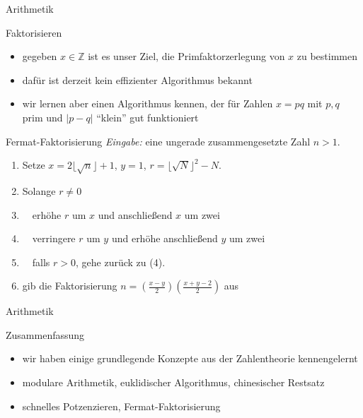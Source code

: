 \documentclass[aspectratio=1610, 11pt]{beamer}
\newcommand\ZZ{\mathbb Z}
\newcommand\bc[1]{\left({#1}\right)}
\newcommand\bcfr[2]{\bc{\frac{#1}{#2}}}
\begin{document}
\begin{frame}{Arithmetik}
	\begin{overprint}
		\begin{exampleblock}{Faktorisieren}
			\begin{itemize}
				\item gegeben $x\in\ZZ$ ist es unser Ziel, die Primfaktorzerlegung von $x$ zu bestimmen
				\item daf\"ur ist derzeit kein effizienter Algorithmus bekannt
				\item wir lernen aber einen Algorithmus kennen, der f\"ur Zahlen $x=pq$ mit $p,q$ prim und $|p-q|$ ``klein'' gut funktioniert
			\end{itemize}
		\end{exampleblock}
		\begin{exampleblock}{Fermat-Faktorisierung}
	{\em Eingabe:} eine ungerade zusammengesetzte Zahl $n>1$.
	\begin{enumerate}
		\item Setze $x=2\lfloor\sqrt n\rfloor+1$, $y=1$, $r=\lfloor\sqrt N\rfloor^2-N$.
		\item Solange $r\neq0$
		\item $\quad$erh\"ohe $r$ um $x$ und anschlie\ss end $x$ um zwei
		\item $\quad$verringere $r$ um $y$ und erh\"ohe anschlie\ss end $y$ um zwei
		\item $\quad$falls $r>0$, gehe zur\"uck zu (4).
		\item gib die Faktorisierung $n=\bcfr{x-y}2\bcfr{x+y-2}2$ aus
	\end{enumerate}
		\end{exampleblock}
	\end{overprint}
\end{frame}

\begin{frame}{Arithmetik}
	\begin{exampleblock}{Zusammenfassung}
		\begin{itemize}
			\item wir haben einige grundlegende Konzepte aus der Zahlentheorie kennengelernt
			\item modulare Arithmetik, euklidischer Algorithmus, chinesischer Restsatz
			\item schnelles Potzenzieren, Fermat-Faktorisierung
		\end{itemize}
	\end{exampleblock}
\end{frame}

 
\end{document}
